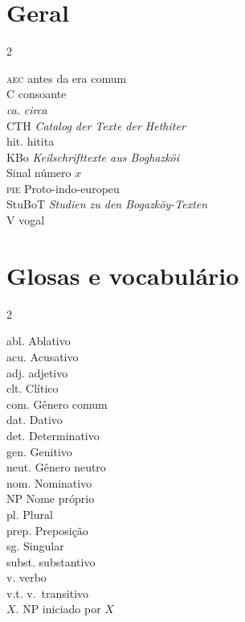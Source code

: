 \newcommand{\abreviacao}[2]{\noindent #1 \hspace{10pt}\hfill #2\\}
\newenvironment{abreviacoes}{
	\flushright%
	\setlength{\columnsep}{50pt}
	\small
	\begin{multicols}{2}
		}{
	\end{multicols}
}

\section*{Geral}
\begin{abreviacoes}
	\abreviacao{\textsc{aec}}{antes da era comum}
	\abreviacao{C}{consoante}
	\abreviacao{\emph{ca.}}{\emph{circa}}
	\abreviacao{CTH}{\emph{\foreignlanguage{german}{Catalog der Texte der Hethiter}}}
	\abreviacao{hit.}{hitita}
	\abreviacao{KBo}{\emph{\foreignlanguage{german}{Keilschrifttexte aus Boghazköi}}}
	\abreviacao{}{Sinal número $x$}
	\abreviacao{\textsc{pie}}{Proto-indo-europeu}
	\abreviacao{StuBoT}{\emph{\foreignlanguage{german}{Studien zu den
				Bogazköy-Texten}}}
	\abreviacao{V}{vogal}
\end{abreviacoes}


\section*{Glosas e vocabulário}
\begin{abreviacoes}
	\abreviacao{abl.}{Ablativo}
	\abreviacao{acu.}{Acusativo}
	\abreviacao{adj.}{adjetivo}
	\abreviacao{clt.}{Clítico}
	\abreviacao{com.}{Gênero comum}
	\abreviacao{dat.}{Dativo}
	\abreviacao{det.}{Determinativo}
	\abreviacao{gen.}{Genitivo}
	\abreviacao{neut.}{Gênero neutro}
	\abreviacao{nom.}{Nominativo}
	\abreviacao{NP}{Nome próprio}
	\abreviacao{pl.}{Plural}
	\abreviacao{prep.}{Preposição}
	\abreviacao{sg.}{Singular}
	\abreviacao{subst.}{substantivo}
	\abreviacao{v.}{verbo}
	\abreviacao{v.t.}{v.\ transitivo}
	\abreviacao{$X$.}{NP iniciado por $X$}
\end{abreviacoes}
